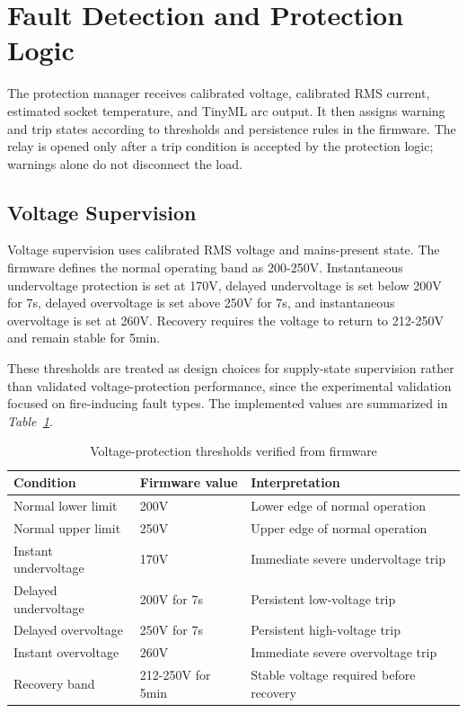 \section{Fault Detection and Protection Logic}
\label{sec:ch3-protection-logic}

The protection manager receives calibrated voltage, calibrated RMS current,
estimated socket temperature, and TinyML arc output. It then assigns warning
and trip states according to thresholds and persistence rules in the firmware.
The relay is opened only after a trip condition is accepted by the protection
logic; warnings alone do not disconnect the load.

\subsection{Voltage Supervision}
\label{sec:ch3-voltage-protection}

Voltage supervision uses calibrated RMS voltage and mains-present state. The
firmware defines the normal operating band as 200-250V. Instantaneous
undervoltage protection is set at 170V, delayed undervoltage is set below
200V for 7s, delayed overvoltage is set above 250V for 7s, and
instantaneous overvoltage is set at 260V. Recovery requires the voltage to
return to 212-250V and remain stable for 5min.

These thresholds are treated as design choices for supply-state supervision
rather than validated voltage-protection performance, since the experimental
validation focused on fire-inducing fault types. The implemented values are
summarized in \textit{Table~\ref{tab:ch3-voltage-thresholds}}.

\begin{table}[H]
  \centering
  \caption{Voltage-protection thresholds verified from firmware}
  \label{tab:ch3-voltage-thresholds}
  \begin{tabular}{@{}p{}p{}p{}@{}}
    \toprule
    \textbf{Condition} & \textbf{Firmware value} & \textbf{Interpretation} \\
    \midrule
    Normal lower limit & 200V & Lower edge of normal operation \\
    Normal upper limit & 250V & Upper edge of normal operation \\
    Instant undervoltage & 170V & Immediate severe undervoltage trip \\
    Delayed undervoltage & 200V for 7s & Persistent low-voltage trip \\
    Delayed overvoltage & 250V for 7s & Persistent high-voltage trip \\
    Instant overvoltage & 260V & Immediate severe overvoltage trip \\
    Recovery band & 212-250V for 5min & Stable voltage required before recovery \\
    \bottomrule
  \end{tabular}
\end{table}

